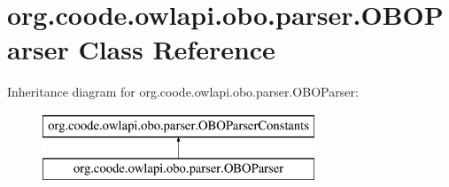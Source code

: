 \hypertarget{classorg_1_1coode_1_1owlapi_1_1obo_1_1parser_1_1_o_b_o_parser}{\section{org.\-coode.\-owlapi.\-obo.\-parser.\-O\-B\-O\-Parser Class Reference}
\label{classorg_1_1coode_1_1owlapi_1_1obo_1_1parser_1_1_o_b_o_parser}
}
Inheritance diagram for org.\-coode.\-owlapi.\-obo.\-parser.\-O\-B\-O\-Parser\-:\begin{figure}[H]
\begin{center}
\leavevmode
\includegraphics[height=2.000000cm]{classorg_1_1coode_1_1owlapi_1_1obo_1_1parser_1_1_o_b_o_parser}
\end{center}
\end{figure}
